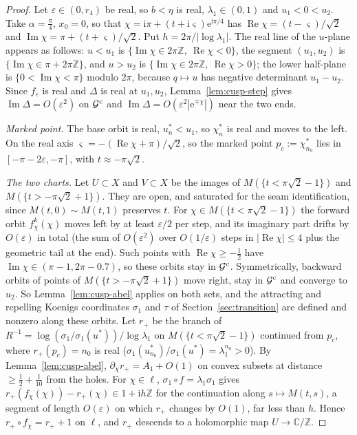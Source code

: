 \documentclass[11pt]{amsart}
\theoremstyle{definition}
\newcommand{\Rr}{R}
\newcommand{\eee}{\mathrm{e}}
\newcommand{\ii}{\mathrm{i}}
\begin{document}
\begin{proof}
Let $\varepsilon\in(0,r_4)$ be real, so $b<\eta$ is real, $\lambda_1\in(0,1)$ and $u_1<0<u_2$.
Take $\alpha=\tfrac\pi4$, $x_0=0$, so that
$\chi=\ii\pi+(t+\ii\varsigma)\eee^{\ii\pi/4}$ has
$\operatorname{Re}\chi=(t-\varsigma)/\sqrt2$ and $\operatorname{Im}\chi=\pi+(t+\varsigma)/\sqrt2$.  Put
$h=2\pi/|\log\lambda_1|$.  The real line of the $u$-plane appears as follows:
$u<u_1$ is $\{\operatorname{Im}\chi\in2\pi\mathbb Z,\ \operatorname{Re}\chi<0\}$, the segment
$(u_1,u_2)$ is $\{\operatorname{Im}\chi\in\pi+2\pi\mathbb Z\}$, and $u>u_2$ is
$\{\operatorname{Im}\chi\in2\pi\mathbb Z,\ \operatorname{Re}\chi>0\}$; the lower half-plane is
$\{0<\operatorname{Im}\chi<\pi\}$ modulo $2\pi$, because $q\mapsto u$ has negative determinant
$u_1-u_2$.  Since $f_\varepsilon$ is real and $\Delta$ is real at $u_1,u_2$,
Lemma~\ref{lem:cusp-step} gives $\operatorname{Im}\Delta=O(\varepsilon^2)$ on $\mathcal G^{\rm c}$ and
$\operatorname{Im}\Delta=O(\varepsilon^2|\eee^{\mp\chi}|)$ near the two ends.

\emph{Marked point.}  The base orbit is real, $u^*_n<u_1$, so $\chi^*_n$ is real and
moves to the left.  On the real axis $\varsigma=-(\operatorname{Re}\chi+\pi)/\sqrt2$, so the marked
point $p_c:=\chi^*_{n_0}$ lies in $[-\pi-2\varepsilon,-\pi]$, with $t\approx-\pi\sqrt2$.

\emph{The two charts.}  Let $U\subset X$ and $V\subset X$ be the images of
$M(\{t<\pi\sqrt2-1\})$ and $M(\{t>-\pi\sqrt2+1\})$.  They are open, and saturated
for the seam identification, since $M(t,0)\sim M(t,1)$ preserves $t$.  For
$\chi\in M(\{t<\pi\sqrt2-1\})$ the forward orbit $f_\chi^k(\chi)$ moves left by at least
$\varepsilon/2$ per step, and its imaginary part drifts by $O(\varepsilon)$ in total (the sum
of $O(\varepsilon^2)$ over $O(1/\varepsilon)$ steps in $|\operatorname{Re}\chi|\le4$ plus the geometric tail
at the end).  Such points with $\operatorname{Re}\chi\ge-\tfrac12$ have
$\operatorname{Im}\chi\in(\pi-1,2\pi-0.7)$, so these orbits stay in $\mathcal G^{\rm c}$.
Symmetrically, backward orbits of points of $M(\{t>-\pi\sqrt2+1\})$ move right,
stay in $\mathcal G^{\rm c}$ and converge to $u_2$.  So Lemma~\ref{lem:cusp-abel} applies
on both sets, and the attracting and repelling Koenigs coordinates $\sigma_1$ and
$\tau$ of Section~\ref{sec:transition} are defined and nonzero along these orbits.
Let $r_+$ be the branch of $\Rr^{-1}=\log(\sigma_1/\sigma_1(u^*))/\log\lambda_1$ on
$M(\{t<\pi\sqrt2-1\})$ continued from $p_c$, where $r_+(p_c)=n_0$ is real
($\sigma_1(u^*_{n_0})/\sigma_1(u^*)=\lambda_1^{n_0}>0$).  By Lemma~\ref{lem:cusp-abel},
$\partial_\chi r_+=A_1+O(1)$ on convex subsets at distance $\ge\tfrac12+\tfrac1{10}$ from the holes.  For
$\chi\in\ell$, $\sigma_1\circ f=\lambda_1\sigma_1$ gives $r_+(f_\chi(\chi))-r_+(\chi)\in1+\ii h\mathbb Z$ for the
continuation along $s\mapsto M(t,s)$, a segment of length $O(\varepsilon)$ on which $r_+$
changes by $O(1)$, far less than $h$.  Hence $r_+\circ f_\chi=r_++1$ on $\ell$, and $r_+$
descends to a holomorphic map $U\to\mathbb C/\mathbb Z$.


\end{proof}
\end{document}
